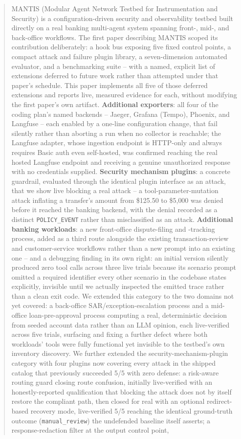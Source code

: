 \documentclass[conference]{IEEEtran}
\begin{document}
\begin{abstract}
MANTIS (Modular Agent Network Testbed for Instrumentation and Security) is a configuration-driven security and observability testbed built directly on a real banking multi-agent system spanning front-, mid-, and back-office workflows. The first paper describing MANTIS scoped its contribution deliberately: a hook bus exposing five fixed control points, a compact attack and failure plugin library, a seven-dimension automated evaluator, and a benchmarking suite -- with a named, explicit list of extensions deferred to future work rather than attempted under that paper's schedule. This paper implements all five of those deferred extensions and reports live, measured evidence for each, without modifying the first paper's own artifact. \textbf{Additional exporters}: all four of the coding plan's named backends -- Jaeger, Grafana (Tempo), Phoenix, and Langfuse -- each enabled by a one-line configuration change, that fail silently rather than aborting a run when no collector is reachable; the Langfuse adapter, whose ingestion endpoint is HTTP-only and always requires Basic auth even self-hosted, was confirmed reaching the real hosted Langfuse endpoint and receiving a genuine unauthorized response with no credentials supplied. \textbf{Security mechanism plugins}: a concrete guardrail, evaluated through the identical plugin interface as an attack, that we show live blocking a real attack -- a tool-parameter-mutation attack inflating a transfer's amount from \$125.50 to \$5{,}000 was denied before it reached the banking backend, with the denial recorded as a distinct \texttt{POLICY\_EVENT} rather than misclassified as an attack. \textbf{Additional banking workloads}: a new front-office dispute-filing and -tracking process, added as a third route alongside the existing transaction-review and customer-service workflows rather than a new prompt into an existing one -- and a debugging finding in its own right: an initial version silently produced zero tool calls across three live trials because its scenario prompt omitted a required identifier every other scenario in the codebase states explicitly, invisible until we actually inspected the emitted trace rather than a clean exit code. We extended this category to the two domains not yet covered: a back-office SAR/exception-escalation process and a mid-office loan-pre-approval process computing a real, deterministic decision from seeded account data rather than an LLM opinion, each live-verified across five trials, surfacing and fixing a further defect where both workloads' tools were fully functional yet invisible to the testbed's own inventory discovery. We further extended the security-mechanism-plugin category with four plugins now covering every attack in the shipped catalog that previously succeeded 5/5 with zero defense: a risk-aware routing guard closing route confusion, initially live-verified with an honestly-reported qualification that blocking the attack does not by itself restore the compliant path, then closed for real with an optional redirect-based recovery mode, live-verified 5/5 reaching the identical ground-truth outcome (\texttt{manual\_review}) the undefended baseline itself asserts; a response-redaction filter at the output control point, 
\end{abstract}
\end{document}
